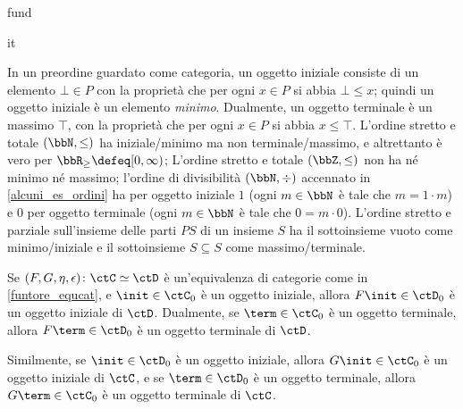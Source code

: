 \begin{hExamples}{fund}
\begin{enumtag}{it}
		\item\label{it_7} In un preordine guardato come categoria, un oggetto iniziale consiste di un elemento \(\bot\in P\) con la proprietà che per ogni \(x\in P\) si abbia \(\bot\le x\); quindi un oggetto iniziale è un elemento \emph{minimo}. Dualmente, un oggetto terminale è un massimo \(\top\), con la proprietà che per ogni \(x\in P\) si abbia \(x\le \top\). L'ordine stretto e totale \((\bbN,\le)\) ha iniziale/minimo ma non terminale/massimo, e altrettanto è vero per \(\bbR_\ge \defeq  [0,\infty)\); L'ordine stretto e totale \((\bbZ,\le)\) non ha né minimo né massimo; l'ordine di divisibilità \((\bbN,\div)\) accennato in \ref{alcuni_es_ordini} ha per oggetto iniziale \(1\) (ogni \(m\in\bbN\) è tale che \(m = 1\cdot m\)) e \(0\) per oggetto terminale (ogni \(m\in\bbN\) è tale che \(0 = m\cdot 0\)). L'ordine stretto e parziale sull'insieme delle parti \(PS\) di un insieme \(S\) ha il sottoinsieme vuoto come minimo/iniziale e il sottoinsieme \(S\subseteq S\) come massimo/terminale.
	\end{enumtag}
\end{hExamples}
\begin{lemma}\label{equivs_preservano_init_term}
	Se \((F,G,\eta,\epsilon)\colon\ctC\simeq\ctD\) è un'equivalenza di categorie come in \ref{funtore_equcat}, e \(\init\in\ctC_0\) è un oggetto iniziale, allora \(F\init\in\ctD_0\) è un oggetto iniziale di \(\ctD\). Dualmente, se \(\term\in\ctC_0\) è un oggetto terminale, allora \(F\term\in\ctD_0\) è un oggetto terminale di \(\ctD\).

	Similmente, se \(\init\in\ctD_0\) è un oggetto iniziale, allora \(G\init\in\ctC_0\) è un oggetto iniziale di \(\ctC\), e se \(\term\in\ctD_0\) è un oggetto terminale, allora \(G\term\in\ctC_0\) è un oggetto terminale di \(\ctC\).
\end{lemma}
